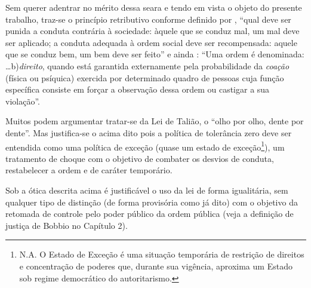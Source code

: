 \documentclass[
	12pt,				%
	openright,			%
	twoside,			%
	a4paper,			%
	chapter=TITLE,		%
	section=TITLE,		%
	subsection=TITLE,	%
	subsubsection=TITLE,%
	spanish,            %
	english,			%
	brazil				%
	]{abntex2}
\begin{document}
\par
Sem querer adentrar no mérito dessa seara e tendo em vista o objeto do presente trabalho, traz-se o princípio retributivo conforme definido por , “qual deve ser punida a conduta contrária à sociedade: àquele que se conduz mal, um mal deve ser aplicado; a conduta adequada à ordem social deve ser recompensada: aquele que se conduz bem, um bem deve ser feito” e ainda : “Uma ordem é denominada: \ldots b)\textit{direito}, quando está garantida externamente pela probabilidade da \textit{coação} (física ou psíquica) exercida por determinado quadro de pessoas cuja função específica consiste em forçar a observação dessa ordem ou castigar a sua violação”.
\par
Muitos podem argumentar tratar-se da Lei de Talião, o “olho por olho, dente por dente”. Mas justifica-se o acima dito pois a política de tolerância zero deve ser entendida como uma política de exceção (quase um estado de exceção\footnote{N.A. O Estado de Exceção é uma situação temporária de restrição de direitos e concentração de poderes que, durante sua vigência, aproxima um Estado sob regime democrático do autoritarismo.}), um tratamento de choque com o objetivo de combater os desvios de conduta, restabelecer a ordem e de caráter temporário.
\par
Sob a ótica descrita acima é justificável o uso da lei de forma igualitária, sem qualquer tipo de distinção (de forma provisória como já dito) com o objetivo da retomada de controle pelo poder público da ordem pública (veja a definição de justiça de Bobbio no Capítulo 2).

\end{document}
